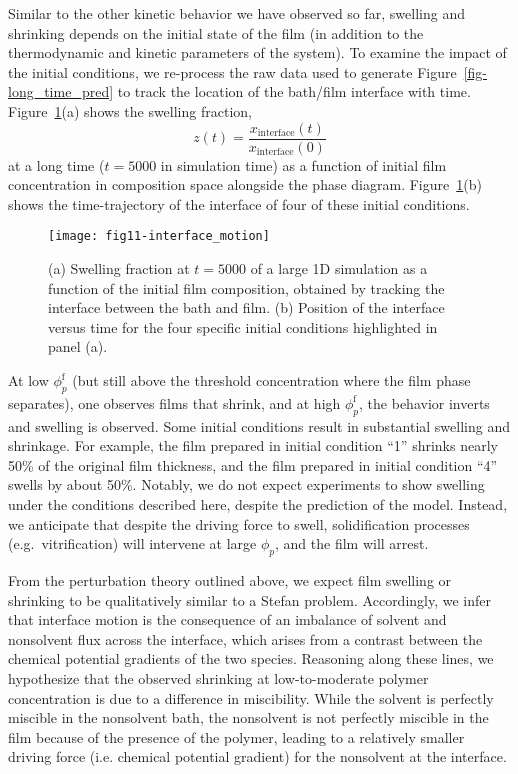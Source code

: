 \documentclass[journal=mamobx, layout=twocolumn]{achemso}
\newcommand{\txtf}{\mathrm{f}}
\begin{document}
Similar to the other kinetic behavior we have observed so far, swelling and shrinking depends on the initial state of the film (in addition to the thermodynamic and kinetic parameters of the system).
To examine the impact of the initial conditions, we re-process the raw data used to generate Figure~\ref{fig-long_time_pred} to track the location of the bath/film interface with time.
Figure~\ref{fig-interface_motion}(a) shows the swelling fraction, 
\begin{equation}
z(t) = \frac{x_{\textrm{interface}}(t)}{x_{\textrm{interface}}(0)}
\end{equation}
at a long time ($t = 5000$ in simulation time) as a function of initial film concentration in composition space alongside the phase diagram.
Figure~\ref{fig-interface_motion}(b) shows the time-trajectory of the interface of four of these initial conditions.

\begin{figure}[tbp]
  \texttt{[image: fig11-interface\_motion]}
  \caption{(a) Swelling fraction at $t = 5000$ of a large 1D simulation as a function of the initial film composition, obtained by tracking the interface between the bath and film.
(b) Position of the interface versus time for the four specific initial conditions highlighted in panel (a).
}
  \label{fig-interface_motion}
\end{figure}

At low $\phi_{p}^{\txtf}$ (but still above the threshold concentration where the film phase separates), one observes films that shrink, and at high $\phi_{p}^{\txtf}$, the behavior inverts and swelling is observed.
Some initial conditions result in substantial swelling and shrinkage. 
For example, the film prepared in initial condition ``1'' shrinks nearly 50\% of the original film thickness, and the film prepared in initial condition ``4'' swells by about 50\%.
Notably, we do not expect experiments to show swelling under the conditions described here, despite the prediction of the model.
Instead, we anticipate that despite the driving force to swell, solidification processes (e.g.\ vitrification) will intervene at large $\phi_{p}$, and the film will arrest.

From the perturbation theory outlined above, we expect film swelling or shrinking to be qualitatively similar to a Stefan problem.
Accordingly, we infer that interface motion is the consequence of an imbalance of solvent and nonsolvent flux across the interface, which arises from a contrast between the chemical potential gradients of the two species.
Reasoning along these lines, we hypothesize that the observed shrinking at low-to-moderate polymer concentration is due to a difference in miscibility.
While the solvent is perfectly miscible in the nonsolvent bath, the nonsolvent is not perfectly miscible in the film because of the presence of the polymer, leading to a relatively smaller driving force (i.e. chemical potential gradient) for the nonsolvent at the interface.
\end{document}
